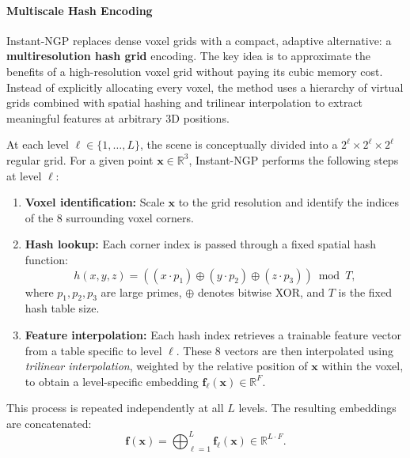 \begin{enrichment}
\begin{enrichment}
    \paragraph{Multiscale Hash Encoding}
    
    Instant-NGP replaces dense voxel grids with a compact, adaptive alternative: a \textbf{multiresolution hash grid} encoding. The key idea is to approximate the benefits of a high-resolution voxel grid without paying its cubic memory cost. Instead of explicitly allocating every voxel, the method uses a hierarchy of virtual grids combined with spatial hashing and trilinear interpolation to extract meaningful features at arbitrary 3D positions.
    
    \medskip
    
    At each level \( \ell \in \{1, \dots, L\} \), the scene is conceptually divided into a \( 2^\ell \times 2^\ell \times 2^\ell \) regular grid. For a given point \( \mathbf{x} \in \mathbb{R}^3 \), Instant-NGP performs the following steps at level \( \ell \):
    
    \begin{enumerate}
        \item \textbf{Voxel identification:} Scale \( \mathbf{x} \) to the grid resolution and identify the indices of the 8 surrounding voxel corners.
        
        \item \textbf{Hash lookup:} Each corner index is passed through a fixed spatial hash function:
        \[
        h(x, y, z) = ((x \cdot p_1) \oplus (y \cdot p_2) \oplus (z \cdot p_3)) \bmod T,
        \]
        where \( p_1, p_2, p_3 \) are large primes, \( \oplus \) denotes bitwise XOR, and \( T \) is the fixed hash table size.
        
        \item \textbf{Feature interpolation:} Each hash index retrieves a trainable feature vector from a table specific to level \( \ell \). These 8 vectors are then interpolated using \emph{trilinear interpolation}, weighted by the relative position of \( \mathbf{x} \) within the voxel, to obtain a level-specific embedding \( \mathbf{f}_\ell(\mathbf{x}) \in \mathbb{R}^F \).
    \end{enumerate}
    
    This process is repeated independently at all \( L \) levels. The resulting embeddings are concatenated:
    \[
    \mathbf{f}(\mathbf{x}) = \bigoplus_{\ell=1}^L \mathbf{f}_\ell(\mathbf{x}) \in \mathbb{R}^{L \cdot F}.
    \]
    

\end{enrichment}
\end{enrichment}
